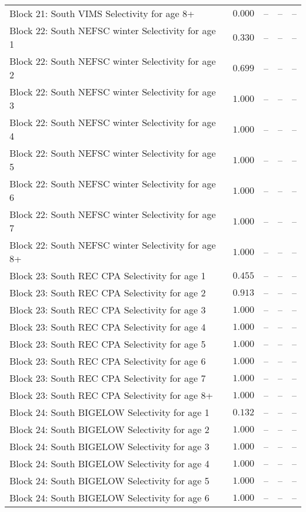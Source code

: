 \documentclass[
]{article}
\begin{document}
\begin{landscape}
\begin{longtable}[t]{lrrrr}
Block 21: South VIMS Selectivity for age 8+ & $0.000$ & -- & -- & --\\
\addlinespace
Block 22: South NEFSC winter Selectivity for age 1 & $0.330$ & -- & -- & --\\
Block 22: South NEFSC winter Selectivity for age 2 & $0.699$ & -- & -- & --\\
Block 22: South NEFSC winter Selectivity for age 3 & $1.000$ & -- & -- & --\\
Block 22: South NEFSC winter Selectivity for age 4 & $1.000$ & -- & -- & --\\
Block 22: South NEFSC winter Selectivity for age 5 & $1.000$ & -- & -- & --\\
\addlinespace
Block 22: South NEFSC winter Selectivity for age 6 & $1.000$ & -- & -- & --\\
Block 22: South NEFSC winter Selectivity for age 7 & $1.000$ & -- & -- & --\\
Block 22: South NEFSC winter Selectivity for age 8+ & $1.000$ & -- & -- & --\\
Block 23: South REC CPA Selectivity for age 1 & $0.455$ & -- & -- & --\\
Block 23: South REC CPA Selectivity for age 2 & $0.913$ & -- & -- & --\\
\addlinespace
Block 23: South REC CPA Selectivity for age 3 & $1.000$ & -- & -- & --\\
Block 23: South REC CPA Selectivity for age 4 & $1.000$ & -- & -- & --\\
Block 23: South REC CPA Selectivity for age 5 & $1.000$ & -- & -- & --\\
Block 23: South REC CPA Selectivity for age 6 & $1.000$ & -- & -- & --\\
Block 23: South REC CPA Selectivity for age 7 & $1.000$ & -- & -- & --\\
\addlinespace
Block 23: South REC CPA Selectivity for age 8+ & $1.000$ & -- & -- & --\\
Block 24: South BIGELOW Selectivity for age 1 & $0.132$ & -- & -- & --\\
Block 24: South BIGELOW Selectivity for age 2 & $1.000$ & -- & -- & --\\
Block 24: South BIGELOW Selectivity for age 3 & $1.000$ & -- & -- & --\\
Block 24: South BIGELOW Selectivity for age 4 & $1.000$ & -- & -- & --\\
\addlinespace
Block 24: South BIGELOW Selectivity for age 5 & $1.000$ & -- & -- & --\\
Block 24: South BIGELOW Selectivity for age 6 & $1.000$ & -- & -- & --\\

\end{longtable}
\end{landscape}
\end{document}
